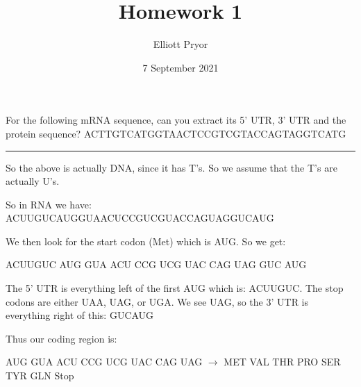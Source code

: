 \documentclass[11pt]{article}
\title{Homework 1}
\author{Elliott Pryor}
\date{7 September 2021}
\begin{document}
\maketitle


For the following mRNA sequence, can you extract its 5’ UTR, 3’ UTR
and the protein sequence?
ACTTGTCATGGTAACTCCGTCGTACCAGTAGGTCATG

\hrule

So the above is actually DNA, since it has T's. So we assume that the T's are actually U's.

So in RNA we have: ACUUGUCAUGGUAACUCCGUCGUACCAGUAGGUCAUG

We then look for the start codon (Met) which is AUG. So we get:

ACUUGUC AUG GUA ACU CCG UCG UAC CAG UAG GUC AUG

The 5' UTR is everything left of the first AUG which is: ACUUGUC.
The stop codons are either UAA, UAG, or UGA. 
We see UAG, so the 3' UTR is everything right of this: GUCAUG

Thus our coding region is:

AUG GUA ACU CCG UCG UAC CAG UAG $\rightarrow$ MET VAL THR PRO SER TYR GLN Stop
\end{document}
